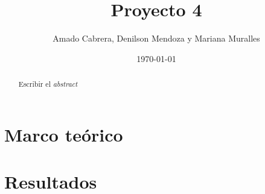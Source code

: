 \documentclass[english,spanish,Ce-table,Ce-theorem]{CabesHW}
\institute{Escuela de Ciencias Físicas y Matemática}
\title{Proyecto 4}
\author{Amado Cabrera, Denilson Mendoza y Mariana Muralles}
\date{\today}
\begin{document}
\maketitle

\begin{abstract}
Escribir el \textit{abstract}
\end{abstract}

\section{Marco teórico}


\section{Resultados}
\end{document}

